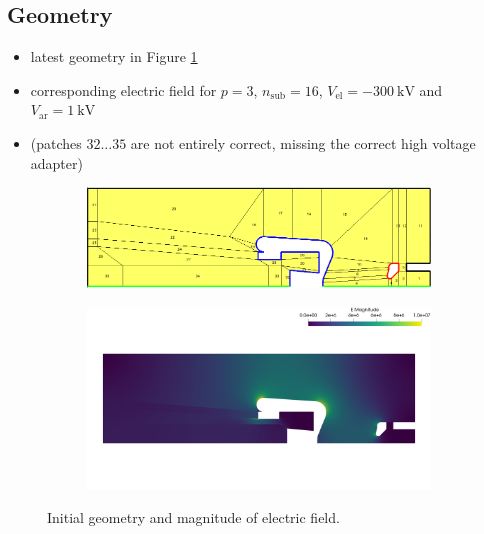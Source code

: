 \subsection{Geometry}
\begin{itemize}
   \item latest geometry in Figure \ref{fig:init}
   \item corresponding electric field for $p=3$, $n_\mathrm{sub}=16$,  $V_\mathrm{el}=-300\ \mathrm{kV}$ and $V_\mathrm{ar}=1\ \mathrm{kV}$
   \item (patches $32 \dots 35$ are not entirely correct, missing the correct high voltage adapter)
\end{itemize}

\begin{center}
\begin{figure}[H]
   \begin{subfigure}{0.45\textwidth}
      \includegraphics[width=\textwidth]{fig/geometry_v6}
   \end{subfigure}
   \begin{subfigure}{0.45\textwidth}
      \includegraphics[width=\textwidth]{fig/E_v6}
   \end{subfigure}
   \caption{Initial geometry and magnitude of electric field.}
   \label{fig:init}
\end{figure}
\end{center}

